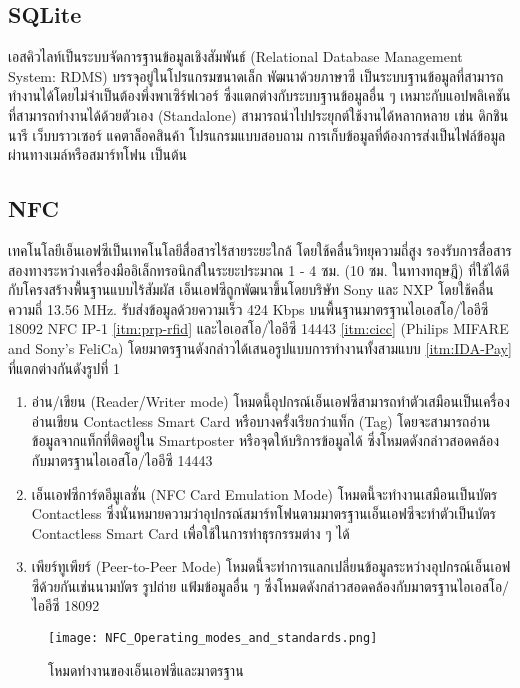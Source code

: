 \documentclass[a4paper]{article}
\begin{document}
\subsection{SQLite}
เอสคิวไลท์เป็นระบบจัดการฐานข้อมูลเชิงสัมพันธ์ (Relational Database Management System: RDMS) บรรจุอยู่ในโปรแกรมขนาดเล็ก พัฒนาด้วยภาษาซี เป็นระบบฐานข้อมูลที่สามารถทำงานได้โดยไม่จำเป็นต้องพึ่งพาเซิร์ฟเวอร์ ซึ่งแตกต่างกับระบบฐานข้อมูลอื่น ๆ เหมาะกับแอปพลิเคชันที่สามารถทำงานได้ด้วยตัวเอง (Standalone) สามารถนำไปประยุกต์ใช้งานได้หลากหลาย เช่น ดิกชินนารี เว็บบราวเซอร์ แคตาล็อคสินค้า โปรแกรมแบบสอบถาม การเก็บข้อมูลที่ต้องการส่งเป็นไฟล์ข้อมูลผ่านทางเมล์หรือสมาร์ทโฟน เป็นต้น

\subsection{NFC}
เทคโนโลยีเอ็นเอฟซีเป็นเทคโนโลยีสื่อสารไร้สายระยะใกล้ โดยใช้คลื่นวิทยุความถี่สูง รองรับการสื่อสารสองทางระหว่างเครื่องมืออิเล็กทรอนิกส์ในระยะประมาณ 1 - 4 ซม. (10 ซม. ในทางทฤษฎี) ที่ใช้ได้ดีกับโครงสร้างพื้นฐานแบบไร้สัมผัส เอ็นเอฟซีถูกพัฒนาขึ้นโดยบริษัท Sony และ NXP โดยใช้คลื่นความถี่ 13.56 MHz. รับส่งข้อมูลด้วยความเร็ว 424 Kbps บนพื้นฐานมาตรฐานไอเอสโอ/ไออีซี 18092 NFC IP-1 \ref{itm:prp-rfid} และไอเอสโอ/ไออีซี 14443 \ref{itm:cicc} (Philips MIFARE and Sony’s FeliCa) โดยมาตรฐานดังกล่าวได้เสนอรูปแบบการทำงานทั้งสามแบบ \ref{itm:IDA-Pay} ที่แตกต่างกันดังรูปที่ 1 

\begin{enumerate}
	\item อ่าน/เขียน (Reader/Writer mode) โหมดนี้อุปกรณ์เอ็นเอฟซีสามารถทำตัวเสมือนเป็นเครื่องอ่านเขียน Contactless Smart Card หรือบางครั้งเรียกว่าแท็ก (Tag) โดยจะสามารถอ่านข้อมูลจากแท็กที่ติดอยู่ใน Smartposter หรือจุดให้บริการข้อมูลได้ ซึ่งโหมดดังกล่าวสอดคล้องกับมาตรฐานไอเอสโอ/ไออีซี 14443
  	\item เอ็นเอฟซีการ์ดอีมูเลชั่น (NFC Card Emulation Mode) โหมดนี้จะทำงานเสมือนเป็นบัตร Contactless ซึ่งนั่นหมายความว่าอุปกรณ์สมาร์ทโฟนตามมาตรฐานเอ็นเอฟซีจะทำตัวเป็นบัตร Contactless Smart Card เพื่อใช้ในการทำธุรกรรมต่าง ๆ ได้
  	\item เพียร์ทูเพียร์ (Peer-to-Peer Mode) โหมดนี้จะทำการแลกเปลี่ยนข้อมูลระหว่างอุปกรณ์เอ็นเอฟซีด้วยกันเช่นนามบัตร รูปถ่าย แฟ้มข้อมูลอื่น ๆ ซึ่งโหมดดังกล่าวสอดคล้องกับมาตรฐานไอเอสโอ/ไออีซี 18092
\end{enumerate}

\begin{figure}[ht!]
\centering
\texttt{[image: NFC\_Operating\_modes\_and\_standards.png]}
\caption{โหมดทำงานของเอ็นเอฟซีและมาตรฐาน}
\label{overflow}
\end{figure}
\end{document}
